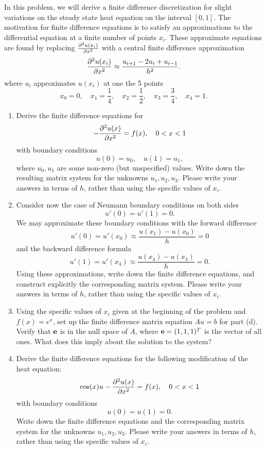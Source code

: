 In this problem, we will derive a finite difference discretization for slight variations on the steady state heat equation on the interval $[0,1]$.  The motivation for finite difference equations is to satisfy an approximations to the differential equation at a finite number of points $x_i$.  These approximate equations are found by replacing $\frac{\partial^{2} u(x_i)}{\partial x^{2}}$ with a central finite difference approximation
\[
\frac{\partial^{2} u(x_i)}{\partial x^{2}} \approx \frac{ u_{i+1} - 2u_i + u_{i-1}}{h^2}.
\]
where $u_i$ approximates $u(x_i)$ at one the 5 points 
\[
x_0 = 0, \quad x_1 = \frac{1}{4}, \quad x_2 = \frac{1}{2}, \quad x_3 = \frac{3}{4}, \quad x_4 = 1.
\]
\begin{enumerate}
\item Derive the finite difference equations for 
\[
- \frac{\partial^{2} u(x)}{\partial x^{2}} = f(x), \quad 0<x<1
\]
with boundary conditions 
\[
u(0) = u_0, \quad u(1) = u_1,
\]
where $u_0, u_1$ are some non-zero (but unspecified) values.  Write down the resulting matrix system for the unknowns $u_1, u_2, u_3$.  Please write your answers in terms of $h$, rather than using the specific values of $x_i$.
\vspace{1em}
\item Consider now the case of Neumann boundary conditions on both sides
\[
u'(0) = u'(1) = 0.
\]
We may approximate these boundary conditions with the forward difference
\[
u'(0) = u'(x_0) \approx \frac{u(x_1)-u(x_0)}{h} = 0
\]
and the backward difference formula
\[
u'(1) = u'(x_{4}) \approx \frac{u(x_{4})-u(x_3)}{h} = 0.
\]
Using these approximations, write down the finite difference equations, and construct explicitly the corresponding matrix system.  Please write your answers in terms of $h$, rather than using the specific values of $x_i$.
\item Using the specific values of $x_i$ given at the beginning of the problem and $f(x) = e^x$, set up the finite difference matrix equation $Au=b$ for part (d).  Verify that ${\bf e}$ is in the null space of ${A}$, where ${\bf e} = (1,1,1)^T$ is the vector of all ones.  What does this imply about the solution to the system?  
\vspace{1em}
\item Derive the finite difference equations for the following modification of the heat equation:
\[
\cos(x) u - \frac{\partial^{2} u(x)}{\partial x^{2}} = f(x), \quad 0<x<1
\]
with boundary conditions 
\[
u(0) = u(1) = 0.
\]
Write down the finite difference equations and the corresponding matrix system for the unknowns $u_1, u_2, u_3$.  Please write your answers in terms of $h$, rather than using the specific values of $x_i$.


\end{enumerate}


